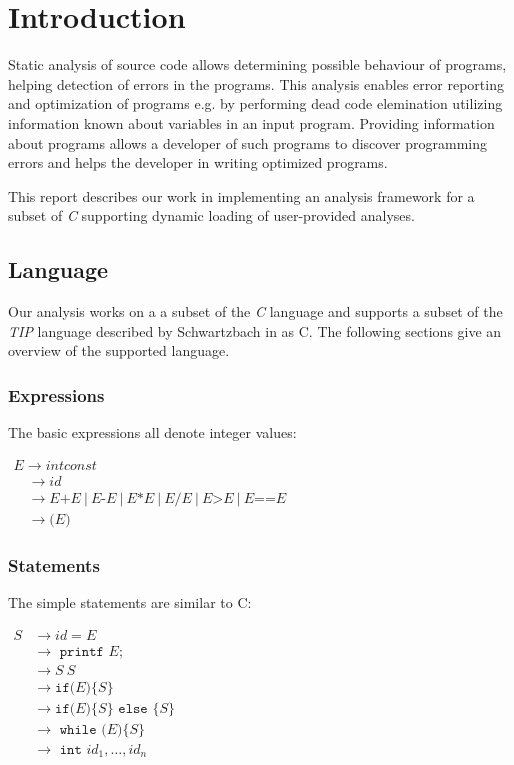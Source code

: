 \section{Introduction}

Static analysis of source code allows determining possible behaviour of programs, helping detection of errors in the programs. This analysis enables error reporting and optimization of programs e.g. by performing dead code elemination utilizing information known about variables in an input program. Providing information about programs allows a developer of such programs to discover programming errors and helps the developer in writing optimized programs.  

\newpar This report describes our work in implementing an analysis framework for a subset of \textit{C} supporting dynamic loading of user-provided analyses. 

\subsection{Language}

\newpar Our analysis works on a a subset of the \textit{C} language and supports a subset of the \textit{TIP} language described by Schwartzbach in \cite{spa} as C. The following sections give an overview of the supported language.

\subsubsection{Expressions}
The basic expressions all denote integer values:
\begin{center}
    $\begin{array}{l}{E \rightarrow { intconst }} \\ {\quad \rightarrow { id }} \\ {\quad \rightarrow E\texttt{+}E\:|\:E\texttt{-}E\:|\:E \texttt{*} E\:|\:E \texttt{/} E\:|\:E\texttt{>}E\:|\:E\texttt{==}E} \\ \quad \rightarrow\texttt{(}E\texttt{)}\end{array}$    
\end{center}

\subsubsection{Statements}
The simple statements are similar to C:
\begin{center}
    $\begin{aligned} S & \rightarrow i d=E \\ & \rightarrow \texttt { printf } E ; \\ & \rightarrow S\:S \\ & \rightarrow \texttt{if(}E\texttt{)}\{S\} \\ & \rightarrow \texttt{if(} E \texttt{)}\{S\} \texttt { else }\{S\} \\ & \rightarrow \texttt { while (}E\texttt{)}\{S\} \\ & \rightarrow \texttt { int } i d_{1}, \ldots, i d_{n} \end{aligned}$
\end{center}

